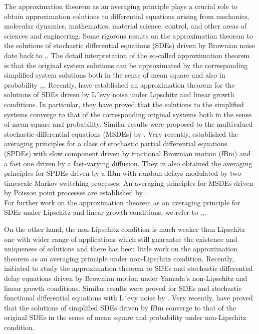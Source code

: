 \documentclass[a4 paper, 12pt]{report}
\theoremstyle{plain}
\begin{document}
\par The approximation theorem as an averaging principle plays a crucial role to
obtain approximation solutions to differential equations arising from mechanics,
molecular dynamics, mathematics, material science, control, and other areas of sciences and engineering. Some rigorous results on the approximation theorem to the
solutions of stochastic differential equations (SDEs) driven by Brownian noise date
back to \cite{6},\cite{7}. The detail interpretation of the so-called approximation theorem is that the original system solutions can be approximated by the
corresponding simplified system solutions both in the sense of mean square and
also in probability \cite{16},\cite{8},\cite{1}. Recently, \cite{20} have established an approximation theorem for the solutions of SDEs driven by L´evy noise under Lipschitz
and linear growth conditions. In particular, they have proved that the solutions
to the simplified systems converge to that of the corresponding original systems
both in the sense of mean square and probability. Similar results were proposed to
the multivalued stochastic differential equations (MSDEs) by \cite{21}. Very recently, \cite{13} established the averaging principles for a class of stochastic partial
differential equations (SPDEs) with slow component driven by fractional Brownian
motion (fBm) and a fast one driven by a fast-varying diffusion. They in \cite{14} also
obtained the averaging principles for SPDEs driven by a fBm with random delays
modulated by two-timescale Markov switching processes. An averaging principles
for MSDEs driven by Poisson point processes are established by \cite{3}.\\
For further work on the approximation theorem as an averaging principle for SDEs
under Lipschitz and linear growth conditions, we refer to \cite{19},\cite{23},\cite{22}.\\

\par On the other hand, the non-Lipschitz condition is much weaker than Lipschitz
one with wider range of applications which still guarantee the existence and uniqueness of solutions and there has been little work on the approximation theorem as an
averaging principle under non-Lipschitz condition. Recently, \cite{17} initiated to study the approximation theorem to SDEs and stochastic differential delay
equations driven by Brownian motion under Yamada’s non-Lipschitz and linear
growth conditions. Similar results were proved for SDEs and stochastic functional
differential equations with L´evy noise by \cite{24}. Very recently, \cite{25}
have proved that the solutions of simplified SDEs driven by fBm converge to that
of the original SDEs in the sense of mean square and probability under \cite{18} non-Lipschitz condition.\\
\end{document}
